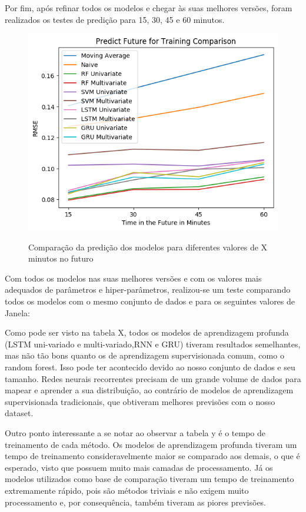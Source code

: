 Por fim, após refinar todos os modelos e chegar às suas melhores versões, foram realizados os testes de predição para 15, 30, 45 e 60 minutos.

\begin{figure}[htbp]
    \centering
    \includegraphics[scale=0.8]{monography/img/predict_future_for_training_comparison_rmse.png}
    \label{figure:res_future}
    \caption{Comparação da predição dos modelos para diferentes valores de X minutos no futuro}
\end{figure}


Com todos os modelos nas suas melhores versões e com os valores mais adequados de parâmetros e hiper-parâmetros, realizou-se um teste comparando todos os modelos com o mesmo conjunto de dados e para os seguintes valores de Janela: 


Como pode ser visto na tabela X,  todos  os  modelos  de aprendizagem  profunda  (LSTM  uni-variado  e  multi-variado,RNN  e  GRU)  tiveram  resultados  semelhantes,  mas  não  tão bons quanto os de aprendizagem supervisionada comum, como o random forest. Isso  pode  ter  acontecido  devido  ao  nosso  conjunto  de dados  e  seu  tamanho.  Redes  neurais  recorrentes  precisam de  um  grande  volume  de  dados  para  mapear  e  aprender  a sua  distribuição,  ao  contrário  de  modelos  de  aprendizagem supervisionada  tradicionais, que obtiveram melhores previsões com o nosso dataset.

Outro  ponto  interessante  a  se  notar ao observar a tabela y  é  o  tempo  de  treinamento de cada método. Os modelos de aprendizagem profunda tiveram um tempo de treinamento consideravelmente maior se comparado aos demais, o que é esperado, visto que possuem muito mais camadas de processamento. Já os  modelos  utilizados  como  base  de  comparação  tiveram um  tempo  de treinamento  extremamente  rápido,  pois  são métodos triviais  e  não  exigem  muito  processamento  e,  por consequência, também tiveram as piores previsões.


